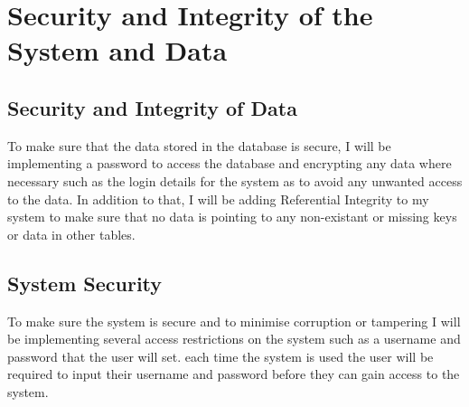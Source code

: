 \section{Security and Integrity of the System and Data}

\subsection{Security and Integrity of Data}
To make sure that the data stored in the database is secure, I will be implementing a password to access the database and encrypting any data where necessary such as the login details for the system as to avoid any unwanted access to the data. In addition to that, I will be adding Referential Integrity to my system to make sure that no data is pointing to any non-existant or missing keys or data in other tables.

\subsection{System Security}
To make sure the system is secure and to minimise corruption or tampering I will be implementing several access restrictions on the system such as a username and password that the user will set. each time the system is used the user will be required to input their username and password before they can gain access to the system.

